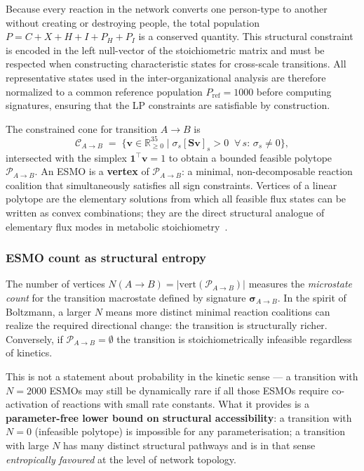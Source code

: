 Because every reaction in the network converts one person-type to another
without creating or destroying people, the total population
$P = C + X + H + I + P_H + P_I$ is a conserved quantity.  This structural
constraint is encoded in the left null-vector of the stoichiometric matrix
and must be respected when constructing characteristic states for cross-scale
transitions.  All representative states used in the inter-organizational
analysis are therefore normalized to a common reference population
$P_{\text{ref}} = 1000$ before computing signatures, ensuring that the
LP constraints are satisfiable by construction.

The constrained cone for transition $A \to B$ is
\begin{equation}
  \mathcal{C}_{A \to B} \;=\; \bigl\{ \mathbf{v} \in \mathbb{R}^{35}_{\geq 0}
  \;\big|\; \sigma_s [\mathbf{S}\mathbf{v}]_s > 0 \;\; \forall\, s:\, \sigma_s \neq 0
  \bigr\},
\end{equation}
intersected with the simplex $\mathbf{1}^{\top}\mathbf{v} = 1$ to obtain
a bounded feasible polytope $\mathcal{P}_{A \to B}$.  An ESMO is a
\textbf{vertex} of $\mathcal{P}_{A \to B}$: a minimal, non-decomposable
reaction coalition that simultaneously satisfies all sign constraints.
Vertices of a linear polytope are the elementary solutions from which all
feasible flux states can be written as convex combinations; they are the
direct structural analogue of elementary flux modes in metabolic
stoichiometry~\cite{schuster1994elementary}.

\subsubsection*{ESMO count as structural entropy}

The number of vertices $N(A \to B) = |\text{vert}(\mathcal{P}_{A \to B})|$
measures the \emph{microstate count} for the transition macrostate defined
by signature $\boldsymbol{\sigma}_{A \to B}$.  In the spirit of Boltzmann,
a larger $N$ means more distinct minimal reaction coalitions can realize the
required directional change: the transition is structurally richer.
Conversely, if $\mathcal{P}_{A \to B} = \emptyset$ the transition is
stoichiometrically infeasible regardless of kinetics.

This is not a statement about probability in the kinetic sense --- a
transition with $N = 2000$ ESMOs may still be dynamically rare if all
those ESMOs require co-activation of reactions with small rate constants.
What it provides is a \textbf{parameter-free lower bound on structural
accessibility}: a transition with $N = 0$ (infeasible polytope) is
impossible for any parameterisation; a transition with large $N$ has many
distinct structural pathways and is in that sense \emph{entropically
favoured} at the level of network topology.

